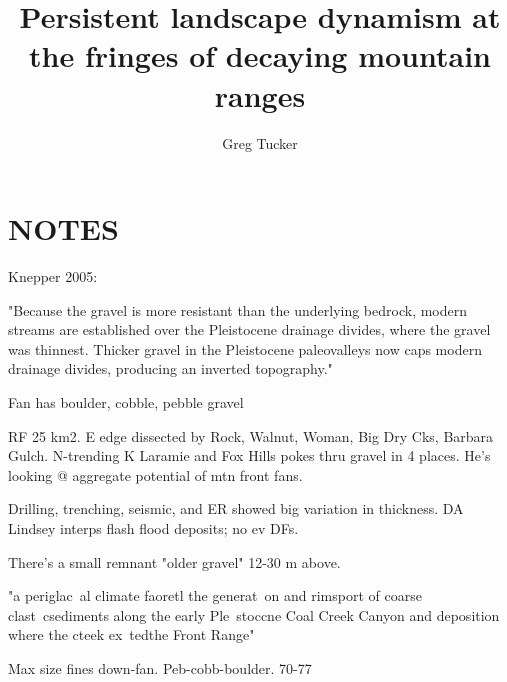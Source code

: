 \documentclass[12pt, oneside]{article}   	%
\title{Persistent landscape dynamism at the fringes of decaying mountain ranges}
\author{Greg Tucker}
\date{}							%
\begin{document}
\maketitle



\section*{NOTES}

Knepper 2005:

"Because the gravel is more
resistant than the underlying bedrock, modern streams are established over the Pleistocene drainage
divides, where the gravel was thinnest. Thicker gravel in the Pleistocene paleovalleys now caps modern
drainage divides, producing an inverted topography."

Fan has boulder, cobble, pebble gravel

RF 25 km2. E edge dissected by Rock, Walnut, Woman, Big Dry Cks, Barbara Gulch. N-trending K Laramie and Fox Hills pokes thru gravel in 4 places. He's looking @ aggregate potential of mtn front fans. 

Drilling, trenching, seismic, and ER showed big variation in thickness. DA Lindsey interps flash flood deposits; no ev DFs.

There's a small remnant "older gravel" 12-30 m above.



"a periglac~al climate fa\-oretl the generat~on
and rimsport of coarse clast~csediments along the early
Ple~stoccne Coal Creek Canyon and deposition where the
cteek ex~tedthe Front Range"

Max size fines down-fan. Peb-cobb-boulder. 70-77%
\end{document}
